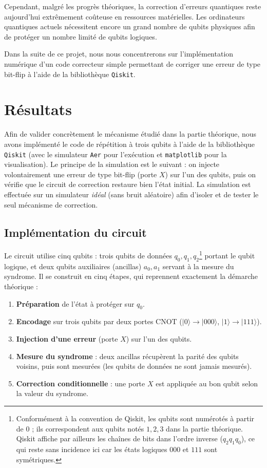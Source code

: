 \documentclass[a4paper,12pt]{article}
\begin{document}
Cependant, malgré les progrès théoriques, la correction d’erreurs quantiques reste aujourd’hui extrêmement coûteuse en ressources matérielles. Les ordinateurs quantiques actuels nécessitent encore un grand nombre de qubits physiques afin de protéger un nombre limité de qubits logiques.

Dans la suite de ce projet, nous nous concentrerons sur l’implémentation numérique d’un code correcteur simple permettant de corriger une erreur de type bit-flip à l’aide de la bibliothèque \texttt{Qiskit}.


\section{Résultats}

Afin de valider concrètement le mécanisme étudié dans la partie théorique, nous
avons implémenté le code de répétition à trois qubits à l'aide de la
bibliothèque \texttt{Qiskit} (avec le simulateur \texttt{Aer} pour l'exécution
et \texttt{matplotlib} pour la visualisation). Le principe de la simulation est
le suivant : on injecte volontairement une erreur de type bit-flip (porte $X$)
sur l'un des qubits, puis on vérifie que le circuit de correction restaure bien
l'état initial. La simulation est effectuée sur un simulateur \emph{idéal} (sans
bruit aléatoire) afin d'isoler et de tester le seul mécanisme de correction.

\subsection{Implémentation du circuit}

Le circuit utilise cinq qubits : trois qubits de données $q_0, q_1, q_2$\footnote{Conformément
à la convention de Qiskit, les qubits sont numérotés à partir de $0$ ; ils
correspondent aux qubits notés $1, 2, 3$ dans la partie théorique. Qiskit
affiche par ailleurs les chaînes de bits dans l'ordre inverse ($q_2 q_1 q_0$),
ce qui reste sans incidence ici car les états logiques $000$ et $111$ sont
symétriques.} portant le qubit logique, et deux qubits auxiliaires (ancillas) $a_0, a_1$ servant à la
mesure du syndrome. Il se construit en cinq étapes, qui reprennent exactement la
démarche théorique :

\begin{enumerate}
    \item \textbf{Préparation} de l'état à protéger sur $q_0$.
    \item \textbf{Encodage} sur trois qubits par deux portes CNOT
          ($|0\rangle \to |000\rangle$, $|1\rangle \to |111\rangle$).
    \item \textbf{Injection d'une erreur} (porte $X$) sur l'un des qubits.
    \item \textbf{Mesure du syndrome} : deux ancillas récupèrent la parité des
          qubits voisins, puis sont mesurées (les qubits de données ne sont
          jamais mesurés).
    \item \textbf{Correction conditionnelle} : une porte $X$ est appliquée au
          bon qubit selon la valeur du syndrome.
\end{enumerate}
\end{document}
